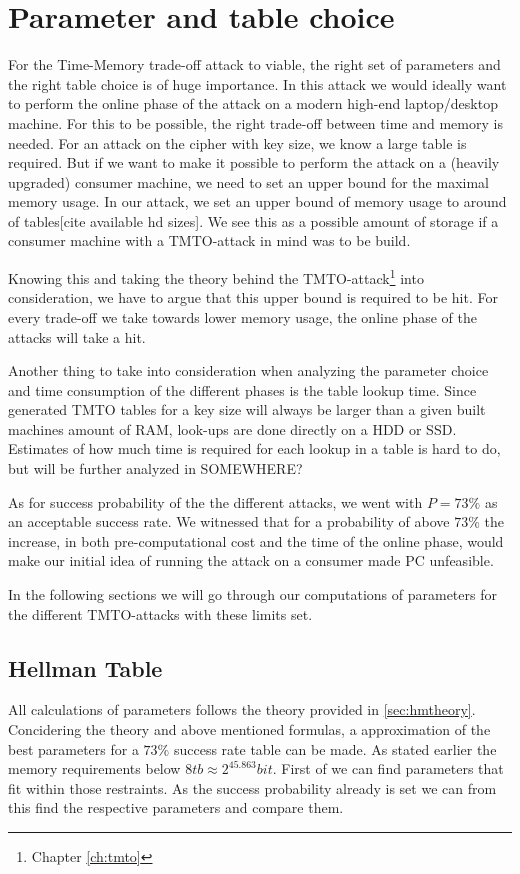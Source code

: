 \chapter{Parameter and table choice}
\label{ch:param}
For the Time-Memory trade-off attack to viable, the right set of
parameters and the right table choice is of huge importance. In this
attack we would ideally want to perform the online phase of the  attack on a modern
high-end laptop/desktop machine. For this to be possible, the right
trade-off between time and memory is needed. For an attack on the
cipher with  key size, we know a large table is required. But if
we want to make it possible to perform the attack on a (heavily
upgraded) consumer
machine, we need to set an upper bound for the maximal memory
usage. In our attack, we set an upper bound of memory usage to around
 of tables[cite available hd sizes]. We see this as a possible amount of storage if a
consumer machine with a TMTO-attack in mind was to be build.

Knowing this and taking the theory behind the
TMTO-attack\footnote{Chapter \ref{ch:tmto}} into consideration, we
have to argue that this upper bound is required to be hit. For every
trade-off we take towards lower memory usage, the online phase of the
attacks will take a hit.

Another thing to take into consideration when analyzing the parameter
choice and time consumption of the different phases is the table lookup
time. Since generated TMTO tables for a  key size will
always be larger than a given built machines amount of RAM, look-ups are
done directly on a HDD or SSD. Estimates of how much time is required
for each lookup in a table is hard to do, but will be further analyzed
in SOMEWHERE?

As for success probability of the
the different attacks, we went with $P = 73\%$ as an acceptable
success rate.
We witnessed that for a probability of above $73\%$ the increase,
in both pre-computational cost and the time of the online phase, would
make our initial idea of running the attack on a consumer made PC
unfeasible.

In the following sections we will go through our computations of
parameters for the different TMTO-attacks with these limits set.

\section{Hellman Table}
All calculations of parameters follows the theory provided in \ref{sec:hmtheory}.
Concidering the theory and above mentioned formulas, a approximation of the best parameters for a $73\%$ success rate table can be made.
As stated earlier the memory requirements below $8tb\approx2^{45.863}bit$. First of we can find parameters that fit within those restraints.
As the success probability already is set we can from this find the respective parameters and compare them.

